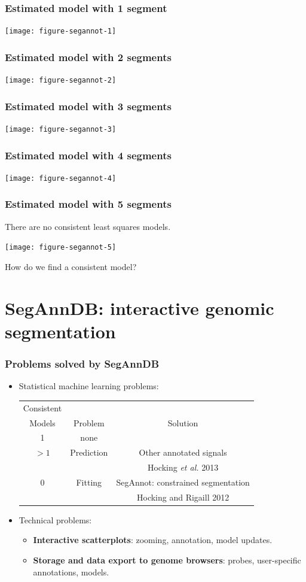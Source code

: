 \documentclass{beamer}
\begin{document}
  \begin{frame}
    \frametitle{Estimated model with 1 segment}
    \texttt{[image: figure-segannot-1]}
  \end{frame}

  \begin{frame}
    \frametitle{Estimated model with 2 segments}
    \texttt{[image: figure-segannot-2]}
  \end{frame}

  \begin{frame}
    \frametitle{Estimated model with 3 segments}
    \texttt{[image: figure-segannot-3]}
  \end{frame}

  \begin{frame}
    \frametitle{Estimated model with 4 segments}
    \texttt{[image: figure-segannot-4]}
  \end{frame}

  \begin{frame}
    \frametitle{Estimated model with 5 segments}

There are no consistent least squares models.

    \texttt{[image: figure-segannot-5]}
    
     How do we find a consistent model?
  \end{frame}

\section{SegAnnDB: interactive genomic segmentation}

  \begin{frame}
    \frametitle{Problems solved by SegAnnDB}
    \begin{itemize}
    \item Statistical machine learning problems:\\
    \begin{tabular}{ccc}
      \hline
      Consistent \\
      Models & Problem & Solution \\
      \hline
      1 & none & \\
      \hline
      $>1$ & Prediction & Other annotated signals\\
      &&Hocking \emph{et al.} 2013\\
      \hline
      0 & Fitting & SegAnnot: constrained segmentation\\
      & & Hocking and Rigaill 2012\\
      \hline
    \end{tabular}
    \item Technical problems:
      \begin{itemize}
      \item \textbf{Interactive scatterplots}: zooming, annotation,
        model updates. 
      \item \textbf{Storage and data export to genome browsers}:
        probes, user-specific annotations, models.
      \end{itemize}
    \end{itemize}
  \end{frame}
\end{document}
